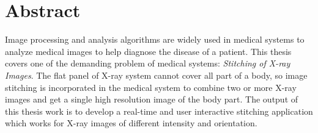 \chapter*{Abstract}



\noindent Image processing and analysis algorithms are widely used in medical systems to analyze medical images to help diagnose the disease of a patient. This thesis covers one of the demanding problem of medical systems: \emph{Stitching of X-ray Images}. The flat panel of X-ray system cannot cover all part of a body, so image stitching is incorporated in the medical system to combine two or more X-ray images and get a single high resolution image of the body part. The output of this thesis work is to develop a real-time and user interactive stitching application which works for X-ray images of different intensity and orientation.\\ 

